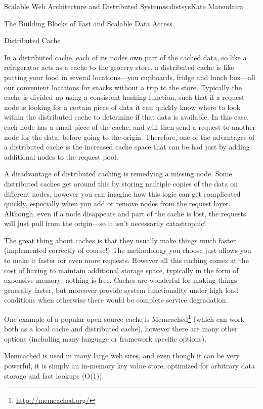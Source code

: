 \begin{aosachapter}{Scalable Web Architecture and Distributed Systems}{s:distsys}{Kate Matsudaira}
\begin{aosasect1}{The Building Blocks of Fast and Scalable Data Access}
\begin{aosasect2}{Distributed Cache}

In a distributed cache, each of its nodes own part of the cached data,
so like a refrigerator acts as a cache to the grocery store, a
distributed cache is like putting your food in several locations---you
cupboards, fridge and lunch box---all our convenient locations for
snacks without a trip to the store. Typically the cache is divided up
using a consistent hashing function, such that if a request node is
looking for a certain piece of data it can quickly know where to look
within the distributed cache to determine if that data is
available. In this case, each node has a small piece of the cache, and
will then send a request to another node for the data, before going to
the origin. Therefore, one of the advantages of a distributed cache is
the increased cache space that can be had just by adding additional
nodes to the request pool.

A disadvantage of distributed caching is remedying a missing
node. Some distributed caches get around this by storing multiple
copies of the data on different nodes, however you can imagine how
this logic can get complicated quickly, especially when you add or
remove nodes from the request layer. Although, even if a node
disappears and part of the cache is lost, the requests will just pull
from the origin---so it isn’t necessarily catastrophic!


The great thing about caches is that they usually make things much
faster (implemented correctly of course!) The methodology you choose
just allows you to make it faster for even more requests. However all
this caching comes at the cost of having to maintain additional
storage space, typically in the form of expensive memory; nothing is
free. Caches are wonderful for making things generally faster, but
moreover provide system functionality under high load conditions when
otherwise there would be complete service degradation.

One example of a popular open source cache is
Memcached\footnote{\url{http://memcached.org/}} (which can work both
as a local cache and distributed cache), however there are many other
options (including many language or framework specific options).

Memcached is used in many large web sites, and even though it can be
very powerful, it is simply an in-memory key value store, optimized
for arbitrary data storage and fast lookups (O(1)).


\end{aosasect2}
\end{aosasect1}
\end{aosachapter}
